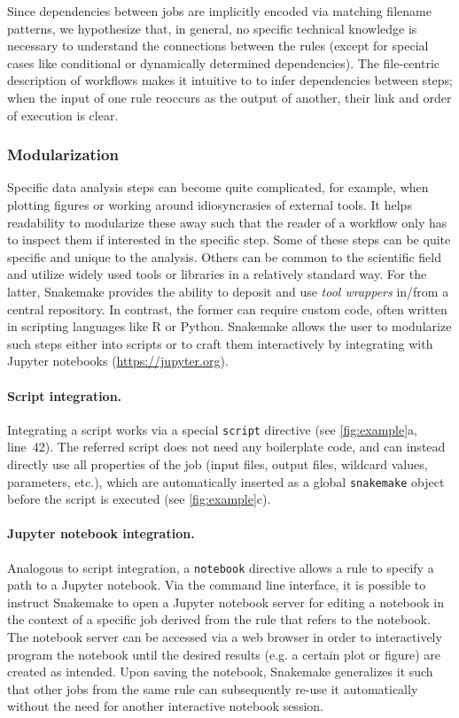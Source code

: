 \documentclass[10pt,a4paper,twocolumn]{article}
\let\plainurl\url
\renewcommand{\url}[1]{\protect\plainurl{#1}}
\begin{document}
Since dependencies between jobs are implicitly encoded via matching filename patterns, we hypothesize that, in general, no specific technical knowledge is necessary to understand the connections between the rules (except for special cases like conditional or dynamically determined dependencies). 
The file-centric description of workflows makes it intuitive to to infer dependencies between steps; when the input of one rule reoccurs as the output of another, their link and order of execution is clear.

\subsubsection{Modularization}\label{sec:modularization}

Specific data analysis steps can become quite complicated, for example, when plotting figures or working around idiosyncrasies of external tools.
It helps readability to modularize these away such that the reader of a workflow only has to inspect them if interested in the specific step.
Some of these steps can be quite specific and unique to the analysis.
Others can be common to the scientific field and utilize widely used tools or libraries in a relatively standard way.
For the latter, Snakemake provides the ability to deposit and use \emph{tool wrappers} in/from a central repository.
In contrast, the former can require custom code, often written in scripting languages like R or Python.
Snakemake allows the user to modularize such steps either into scripts or to craft them interactively by integrating with Jupyter notebooks (\url{https://jupyter.org}).

\paragraph{Script integration.}
Integrating a script works via a special \lstinline!script! directive (see \autoref{fig:example}a, line~42).
The referred script does not need any boilerplate code, and can instead directly use all properties of the job (input files, output files, wildcard values, parameters, etc.), which are automatically inserted as a global \lstinline!snakemake! object before the script is executed (see \autoref{fig:example}c).

\paragraph{Jupyter notebook integration.}
Analogous to script integration, a \lstinline!notebook! directive allows a rule to specify a path to a Jupyter notebook.
Via the command line interface, it is possible to instruct Snakemake to open a Jupyter notebook server for editing a notebook in the context of a specific job derived from the rule that refers to the notebook.
The notebook server can be accessed via a web browser in order to interactively program the notebook until the desired results (e.g. a certain plot or figure) are created as intended.
Upon saving the notebook, Snakemake generalizes it such that other jobs from the same rule can subsequently re-use it automatically without the need for another interactive notebook session.
\end{document}
